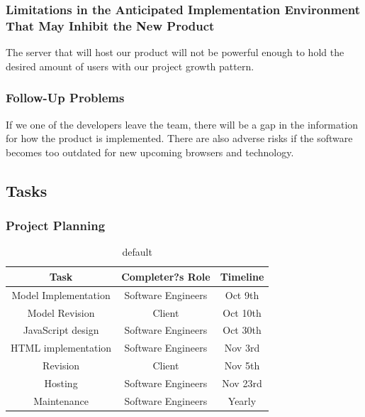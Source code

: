 \documentclass[11pt, oneside]{article}   	%
\begin{document}
\subsubsection*{Limitations in the Anticipated Implementation Environment That May Inhibit the New Product}
The server that will host our product will not be powerful enough to hold the desired amount of users with our project growth pattern.


\subsubsection*{Follow-Up Problems}
If we one of the developers leave the team, there will be a gap in the information for how the product is implemented. There are also adverse risks if the software becomes too outdated for new upcoming browsers and technology.


\subsection*{Tasks}
\subsubsection*{Project Planning}
\begin{table}[H]
\caption{default}
\begin{center}
\begin{tabular}{|c|c|c|}
\hline
Task	& Completer?s Role & Timeline\\
\hline
Model Implementation & Software Engineers & Oct 9th\\
\hline
Model Revision	& Client & Oct 10th\\
\hline
JavaScript design & Software Engineers & Oct 30th\\
\hline
HTML implementation & Software Engineers & Nov 3rd\\
\hline
Revision & Client & Nov 5th\\
\hline
Hosting & Software Engineers & Nov 23rd\\
\hline
Maintenance & Software Engineers & Yearly\\
\hline
\end{tabular}
\end{center}
\label{default}
\end{table}%
\end{document}
